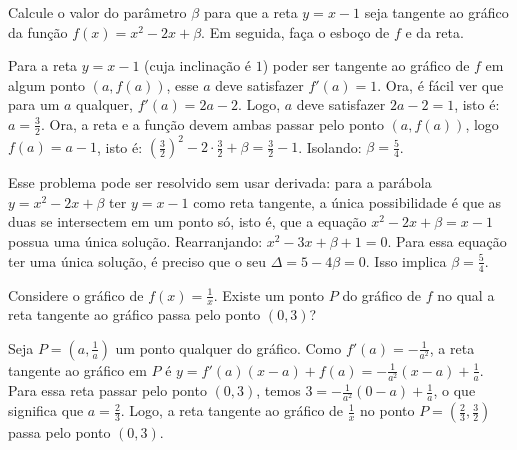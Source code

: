 \begin{exo}
Calcule o valor do parâmetro $\beta$ para que a reta $y=x-1$ seja tangente
ao gráfico da função $f(x)=x^2-2x+\beta$. Em seguida, faça o esboço de 
$f$ e da reta.
\begin{sol}
Para a reta $y=x-1$ (cuja inclinação é $1$) poder ser tangente ao gráfico de
$f$ em algum ponto $(a,f(a))$, esse $a$ deve satisfazer $f'(a)=1$. Ora, é fácil
ver que para um $a$ qualquer, $f'(a)=2a-2$. Logo, $a$ deve satisfazer $2a-2=1$,
isto é: $a=\frac32$. Ora, a reta e a função devem ambas passar pelo ponto
$(a,f(a))$, logo $f(a)=a-1$, isto é:
$(\frac32)^2-2\cdot\frac32+\beta=\frac32-1$. Isolando:
$\beta=\frac{5}{4}$.
\begin{center}
\begin{bmlimage}\end{bmlimage}
\end{center}
Esse problema pode ser resolvido sem usar derivada:
para a parábola $y=x^2-2x+\beta$ ter $y=x-1$ como reta tangente, a única
possibilidade é que as duas se intersectem em um ponto só, isto é, que a
equação $x^2-2x+\beta=x-1$ possua uma única solução. Rearranjando:
$x^2-3x+\beta+1=0$. Para essa equação ter uma única solução, é preciso que o
seu $\Delta=5-4\beta=0$. Isso implica $\beta=\frac{5}{4}$.
\end{sol}
\end{exo}

\begin{exo}
Considere o gráfico de $f(x)=\frac{1}{x}$. Existe um ponto $P$ do gráfico
de $f$ no qual a reta tangente ao gráfico
passa pelo ponto $(0,3)$?
\begin{sol}
Seja $P=(a,\frac1a)$ um ponto qualquer do gráfico. Como 
$f'(a)=-\frac{1}{a^2}$, a reta tangente ao gráfico em $P$ é 
$y=f'(a)(x-a)+f(a)=-\frac{1}{a^2}(x-a)+\frac1a$. Para essa reta passar pelo
ponto $(0,3)$, temos $3=-\frac{1}{a^2}(0-a)+\frac1a$, o que
significa que $a=\frac{2}{3}$.
Logo, a reta tangente ao gráfico de $\frac1x$ no ponto $P=(\frac23,\frac32)$
passa pelo ponto $(0,3)$.
\end{sol}
\end{exo}

